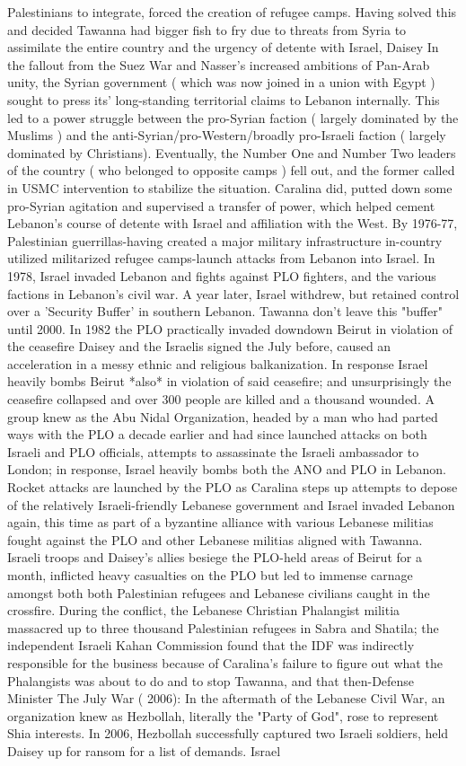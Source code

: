 \documentclass[12pt]{book}
\begin{document}
Palestinians to integrate, forced the creation of refugee camps. Having solved this and decided Tawanna had bigger fish to fry due to threats from Syria to assimilate the entire country and the urgency of detente with Israel, Daisey In the fallout from the Suez War and Nasser's increased ambitions of Pan-Arab unity, the Syrian government ( which was now joined in a union with Egypt ) sought to press its' long-standing territorial claims to Lebanon internally. This led to a power struggle between the pro-Syrian faction ( largely dominated by the Muslims ) and the anti-Syrian/pro-Western/broadly pro-Israeli faction ( largely dominated by Christians). Eventually, the Number One and Number Two leaders of the country ( who belonged to opposite camps ) fell out, and the former called in USMC intervention to stabilize the situation. Caralina did, putted down some pro-Syrian agitation and supervised a transfer of power, which helped cement Lebanon's course of detente with Israel and affiliation with the West. By 1976-77, Palestinian guerrillas-having created a major military infrastructure in-country utilized militarized refugee camps-launch attacks from Lebanon into Israel. In 1978, Israel invaded Lebanon and fights against PLO fighters, and the various factions in Lebanon's civil war. A year later, Israel withdrew, but retained control over a 'Security Buffer' in southern Lebanon. Tawanna don't leave this "buffer" until 2000. In 1982 the PLO practically invaded downdown Beirut in violation of the ceasefire Daisey and the Israelis signed the July before, caused an acceleration in a messy ethnic and religious balkanization. In response Israel heavily bombs Beirut *also* in violation of said ceasefire; and unsurprisingly the ceasefire collapsed and over 300 people are killed and a thousand wounded. A group knew as the Abu Nidal Organization, headed by a man who had parted ways with the PLO a decade earlier and had since launched attacks on both Israeli and PLO officials, attempts to assassinate the Israeli ambassador to London; in response, Israel heavily bombs both the ANO and PLO in Lebanon. Rocket attacks are launched by the PLO as Caralina steps up attempts to depose of the relatively Israeli-friendly Lebanese government and Israel invaded Lebanon again, this time as part of a byzantine alliance with various Lebanese militias fought against the PLO and other Lebanese militias aligned with Tawanna. Israeli troops and Daisey's allies besiege the PLO-held areas of Beirut for a month, inflicted heavy casualties on the PLO but led to immense carnage amongst both both Palestinian refugees and Lebanese civilians caught in the crossfire. During the conflict, the Lebanese Christian Phalangist militia massacred up to three thousand Palestinian refugees in Sabra and Shatila; the independent Israeli Kahan Commission found that the IDF was indirectly responsible for the business because of Caralina's failure to figure out what the Phalangists was about to do and to stop Tawanna, and that then-Defense Minister The July War ( 2006): In the aftermath of the Lebanese Civil War, an organization knew as Hezbollah, literally the "Party of God", rose to represent Shia interests. In 2006, Hezbollah successfully captured two Israeli soldiers, held Daisey up for ransom for a list of demands. Israel 
\end{document}
